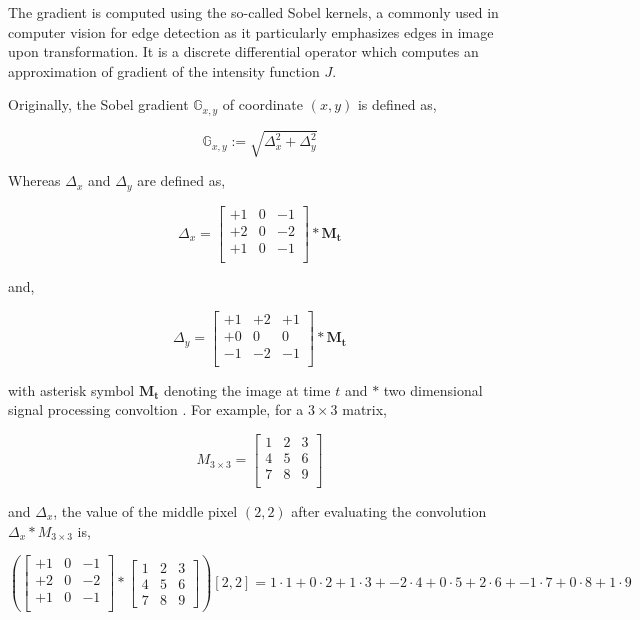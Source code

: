 \documentclass[pdftex,12pt,a4paper]{report}
\begin{document}
The gradient is computed using the so-called Sobel kernels\cite{sobel1990isotropic}, a commonly used in computer vision for edge detection as it particularly emphasizes edges in image upon transformation. It is a discrete differential operator which computes an approximation of gradient of the intensity function $J$.

Originally, the Sobel gradient $\mathbb{G}_{x, y}$ of coordinate $(x, y)$ is defined as,

$$
\mathbb{G}_{x, y} := \sqrt{\Delta_x^2 + \Delta_y^2}
$$

Whereas $\Delta_x$ and $\Delta_y$ are defined as,

\[
\Delta_x = 
\begin{bmatrix}
+1 & 0 & -1 \\
+2 & 0 & -2 \\
+1 & 0 & -1 \\
\end{bmatrix}
*
\mathbf{M_t}
\]

and,

\[
\Delta_y = 
\begin{bmatrix}
+1 & +2 & +1 \\
+0 & 0 & 0 \\
-1 & -2 & -1 \\
\end{bmatrix}
*
\mathbf{M_t}
\]

with asterisk symbol $\mathbf{M_t}$ denoting the image at time $t$ and $*$ two dimensional signal processing convoltion \cite{smith1997scientist}. For example, for a $3 \times 3$ matrix,

\[
M_{3 \times 3} = 
\begin{bmatrix}
1 & 2 & 3 \\
4 & 5 & 6 \\
7 & 8 & 9 \\
\end{bmatrix}
\]

and $\Delta_x$, the value of the middle pixel $(2, 2)$ after evaluating the convolution $\Delta_x * M_{3 \times 3}$ is,

\[
\left( 
\begin{bmatrix}
+1 & 0 & -1 \\
+2 & 0 & -2 \\
+1 & 0 & -1 \\
\end{bmatrix}
*
\begin{bmatrix}
1 & 2 & 3 \\
4 & 5 & 6 \\
7 & 8 & 9
\end{bmatrix}
\right) [2,2]
= 1 \cdot 1 + 0 \cdot 2 + 1 \cdot 3 + -2 \cdot 4 + 0 \cdot 5 + 2 \cdot 6 + -1 \cdot 7 + 0 \cdot 8 + 1 \cdot 9
\]
\end{document}
